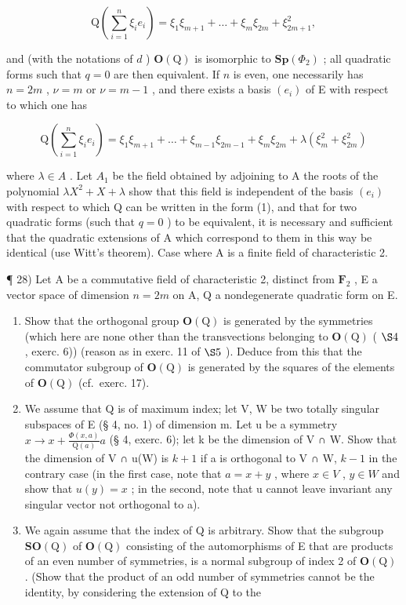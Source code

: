 \[
\mathrm{Q} \left(\sum_ {i = 1} ^ {n} \xi_ {i} e _ {i}\right) = \xi_ {1} \xi_ {m + 1} + \dots + \xi_ {m} \xi_ {2 m} + \xi_ {2 m + 1} ^ {2},
\]

and (with the notations of \(d\) ) \(\mathbf{O}(\mathrm{Q})\) is isomorphic to \(\mathbf{Sp}(\Phi_{2})\) ; all quadratic forms such that \(q=0\) are then equivalent. If \(n\) is even, one necessarily has \(n=2m\) , \(\nu=m\) or \(\nu=m-1\) , and there exists a basis \((e_{i})\) of E with respect to which one has

\[
\mathrm{Q} \left(\sum_ {i = 1} ^ {n} \xi_ {i} e _ {i}\right) = \xi_ {1} \xi_ {m + 1} + \dots + \xi_ {m - 1} \xi_ {2 m - 1} + \xi_ {m} \xi_ {2 m} + \lambda \left(\xi_ {m} ^ {2} + \xi_ {2 m} ^ {2}\right)\tag{1}
\]

where \(\lambda\in A\) . Let \(A_{1}\) be the field obtained by adjoining to A the roots of the polynomial \(\lambda X^{2}+X+\lambda\) show that this field is independent of the basis \((e_{i})\) with respect to which Q can be written in the form (1), and that for two quadratic forms (such that \(q=0\) ) to be equivalent, it is necessary and sufficient that the quadratic extensions of A which correspond to them in this way be identical (use Witt's theorem). Case where A is a finite field of characteristic 2.

¶ 28) Let A be a commutative field of characteristic 2, distinct from \(\mathbf{F}_{2}\) , E a vector space of dimension \(n = 2m\) on A, Q a nondegenerate quadratic form on E.

\begin{enumerate}
\def\labelenumi{\alph{enumi})}
\item
  Show that the orthogonal group \(\mathbf{O}(\mathrm{Q})\) is generated by the symmetries (which here are none other than the transvections belonging to \(\mathbf{O}(\mathrm{Q})\) ( \(\S 4\) , exerc. 6)) (reason as in exerc. 11 of \(\S 5\) ). Deduce from this that the commutator subgroup of \(\mathbf{O}(\mathrm{Q})\) is generated by the squares of the elements of \(\mathbf{O}(\mathrm{Q})\) (cf.~exerc. 17).
\item
  We assume that Q is of maximum index; let V, W be two totally singular subspaces of E (§ 4, no. 1) of dimension m. Let u be a symmetry \(x \to x + \frac{\Phi(x, a)}{\mathrm{Q}(a)} a\) (§ 4, exerc. 6); let k be the dimension of V ∩ W. Show that the dimension of V ∩ u(W) is \(k + 1\) if a is orthogonal to V ∩ W, \(k - 1\) in the contrary case (in the first case, note that \(a = x + y\) , where \(x \in V\) , \(y \in W\) and show that \(u(y) = x\) ; in the second, note that u cannot leave invariant any singular vector not orthogonal to a).
\item
  We again assume that the index of Q is arbitrary. Show that the subgroup \(\mathbf{SO}(\mathrm{Q})\) of \(\mathbf{O}(\mathrm{Q})\) consisting of the automorphisms of E that are products of an even number of symmetries, is a normal subgroup of index 2 of \(\mathbf{O}(\mathrm{Q})\) . (Show that the product of an odd number of symmetries cannot be the identity, by considering the extension of Q to the
\end{enumerate}


